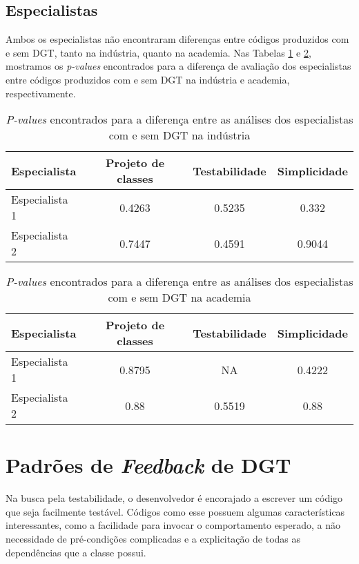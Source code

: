 \subsection{Especialistas}

Ambos os especialistas não encontraram diferenças entre códigos produzidos
com e sem DGT, tanto na indústria, quanto na academia. Nas Tabelas 
\ref{tab:especialistas-industria} e \ref{tab:especialistas-academia},
mostramos os \textit{p-values} encontrados para a diferença de avaliação dos especialistas
entre códigos produzidos com e sem DGT na indústria e academia, respectivamente.


\begin{table}[h!]
	\centering
	\begin{tabular}{| p{5cm} | c | c | c | }
		\hline
		Especialista & Projeto de classes & Testabilidade & Simplicidade\\
		\hline
		Especialista 1 &	0.4263 &	0.5235 &	0.332\\
		Especialista 2 &	0.7447 &	0.4591 &	0.9044\\
		\hline
	\end{tabular}
	\caption{\textit{P-values} encontrados para a diferença entre as análises dos especialistas com e sem DGT na indústria}
	\label{tab:especialistas-industria}
\end{table}

\begin{table}[h!]
	\centering
	\begin{tabular}{| p{5cm} | c | c | c | }
		\hline
		Especialista & Projeto de classes & Testabilidade & Simplicidade\\
		\hline
		Especialista 1	& 0.8795 &	NA	& 0.4222\\
		Especialista 2	& 0.88	& 0.5519 &	0.88\\
		\hline
	\end{tabular}
	\caption{\textit{P-values} encontrados para a diferença entre as análises dos especialistas com e sem DGT na academia}
	\label{tab:especialistas-academia}
\end{table}


\section{Padrões de \textit{Feedback} de DGT}
\label{padroes-tdd}

Na busca pela testabilidade, o desenvolvedor é encorajado a escrever um
código que seja facilmente testável. Códigos como esse possuem algumas
características interessantes, como a facilidade para invocar o comportamento
esperado, a não necessidade de pré-condições complicadas e a explicitação de
todas as dependências que a classe possui.

